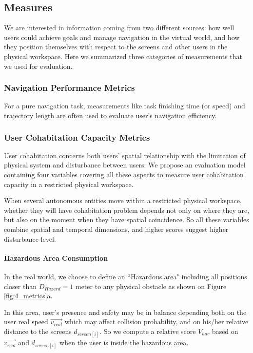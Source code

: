 \subsection{Measures}
We are interested in information coming from two different sources: how well users could achieve goals and manage navigation in the virtual world, and how they position themselves with respect to the screens and other users in the physical workspace. Here we summarized three categories of measurements that we used for evaluation.

\subsubsection{Navigation Performance Metrics}
For a pure navigation task, measurements like task finishing time (or speed) and trajectory length are often used to evaluate user's navigation efficiency.

\subsubsection{User Cohabitation Capacity Metrics}
User cohabitation concerns both users' spatial relationship with the limitation of physical system and disturbance between users. We propose an evaluation model containing four variables covering all these aspects to measure user cohabitation capacity in a restricted physical workspace.

When several autonomous entities move within a restricted physical workspace, whether they will have cohabitation problem depends not only on where they are, but also on the moment when they have spatial coincidence. So all these variables combine spatial and temporal dimensions, and higher scores suggest higher disturbance level.

\paragraph{Hazardous Area Consumption}
In the real world, we choose to define an ``Hazardous area" including all positions closer than $D_{Hazard}=1$ meter to any physical obstacle as shown on Figure \ref{fig:4_metrics}a.

In this area, user's presence and safety may be in balance depending both on the user real speed $\overrightarrow{v_{real}}$ which may affect collision probability, and on his/her relative distance to the screens $d_{screen[i]}$. So we compute a relative score $V_{hac}$ based on $\overrightarrow{v_{real}}$ and $d_{screen[i]}$ when the user is inside the hazardous area. 

